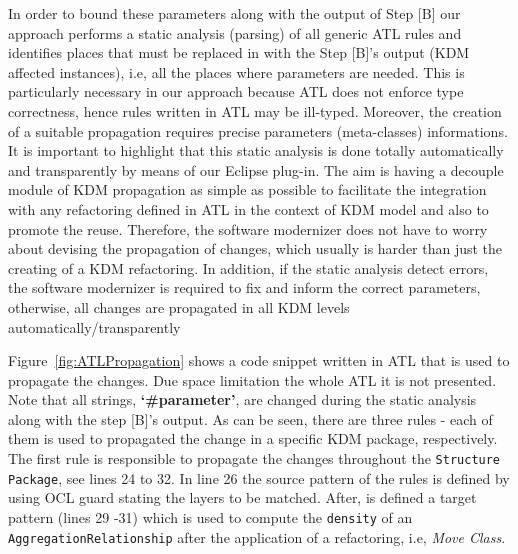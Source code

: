 In order to bound these parameters along with the output of Step [B] our approach performs a static analysis (parsing) of all generic ATL rules and identifies places that must be replaced in with the Step [B]'s output (KDM affected instances), i.e, all the places where parameters are needed. This is particularly necessary in our approach because ATL does not enforce type correctness, hence rules written in ATL may be ill-typed. Moreover, the creation of a suitable propagation %
requires precise parameters (meta-classes) informations. It is important to highlight that this static analysis is done totally automatically and transparently by means of our Eclipse plug-in. The aim is having a decouple module of KDM propagation as simple as possible to facilitate the integration with any refactoring defined in ATL in the context of KDM model and also to promote the reuse. Therefore, the software modernizer does not have to worry about devising the propagation of changes, which usually is harder than just the creating of a KDM refactoring. 
%
In addition, if the static analysis detect errors, the software modernizer is required to fix and inform the correct parameters, otherwise, all changes are propagated in all KDM levels automatically/transparently  


Figure~\ref{fig:ATLPropagation} shows a code snippet written in ATL that is used to propagate the changes. Due space limitation the whole ATL it is not presented. Note that all strings, \textbf{`\#parameter'}, are changed during the static analysis along with the step [B]'s output. As can be seen, there are three rules - each of them is used to propagated the change in a specific KDM package, respectively. The first rule is responsible to propagate the changes throughout the \texttt{Structure Package}, see lines 24 to 32. In line 26 the source pattern of the rules is defined by using OCL guard stating the layers to be matched. After, is defined a target pattern (lines 29 -31) which is used to compute the \texttt{density} of an \texttt{AggregationRelationship} after the application of a refactoring, i.e, \textit{Move Class}.

